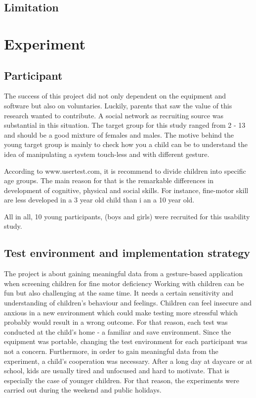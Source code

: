 \subsection{Limitation}

\section{Experiment }
\label{sec:experiment}


\subsection{Participant}
\label{sec:participant}

The success of this project did not only dependent on the equipment and software but also on voluntaries. Luckily,  parents that saw the value of this research wanted to contribute. A social network as recruiting source was substantial in this situation. The target group for this study ranged from 2 - 13 and should be a good mixture of females and males.
The motive behind the young target group is mainly to check how you a child can be to understand the idea of manipulating a system touch-less and with different gesture. 

According to www.usertest.com, it is recommend to divide children into specific age groups. The main reason for that is the remarkable differences in development of cognitive, physical and social skills. For instance, fine-motor skill are less developed in a 3 year old child than i an a 10 year old.

All in all, 10 young participants, (boys and girls) were recruited for this usability study.


\subsection{Test environment and implementation strategy}
\label{sec:environmnent}

The project is about gaining meaningful data from a gesture-based application when screening children for fine motor deficiency
Working with children can be fun but also challenging at the same time. It needs a certain sensitivity and understanding of children's behaviour and feelings. Children can feel insecure  and anxious in a new environment which could make testing more stressful which probably would result in a wrong outcome. For that reason, each test was conducted at the child's home - a familiar and save environment. Since the equipment was portable, changing the test environment for each participant was not a concern.
Furthermore, in order to gain meaningful data from the experiment, a child's cooperation was necessary.  After a long day at daycare or at school, kids are usually tired and unfocused and hard to motivate. That is especially the case of younger children. For that reason, the experiments were carried out during the weekend and public holidays.  

